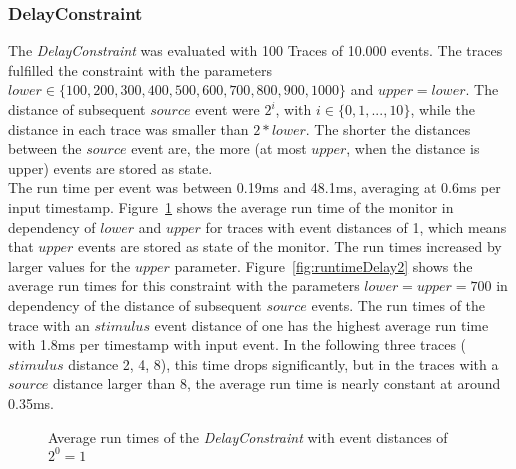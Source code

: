 \subsubsection{DelayConstraint}
	The \textit{DelayConstraint} was evaluated with 100 Traces of 10.000 events. The traces fulfilled the constraint with the parameters $lower\in\{100, 200, 300, 400, 500, 600, 700, 800, 900, 1000\}$ and $upper=lower$.  The distance of subsequent $source$ event were $2^i$, with $i\in \{0, 1, ..., 10\}$, while the distance in each trace was smaller than $2*lower$. The shorter the distances between the $source$ event are, the more (at most $upper$, when the distance is upper) events are stored as state.\\
	The run time per event was between 0.19ms and 48.1ms, averaging at 0.6ms per input timestamp. Figure~\ref{fig:runtimeDelay1} shows the average run time of the monitor in dependency of $lower$ and $upper$ for traces with event distances of 1, which means that $upper$ events are stored as state of the monitor. The run times increased by larger values for the $upper$ parameter.
	Figure~\ref{fig:runtimeDelay2} shows the average run times for this constraint with the parameters $lower=upper=700$ in dependency of the distance of subsequent $source$ events. The run times of the trace with an $stimulus$ event distance of one has the highest average run time with 1.8ms per timestamp with input event. In the following three traces ($stimulus$ distance 2, 4, 8), this time drops significantly, but in the traces with a $source$ distance larger than 8, the average run time is nearly constant at around 0.35ms.
	\begin{figure}
		\centering
		\caption{Average run times of the \textit{DelayConstraint} with event distances of $2^0=1$}
		\label{fig:runtimeDelay1}
	\end{figure}
